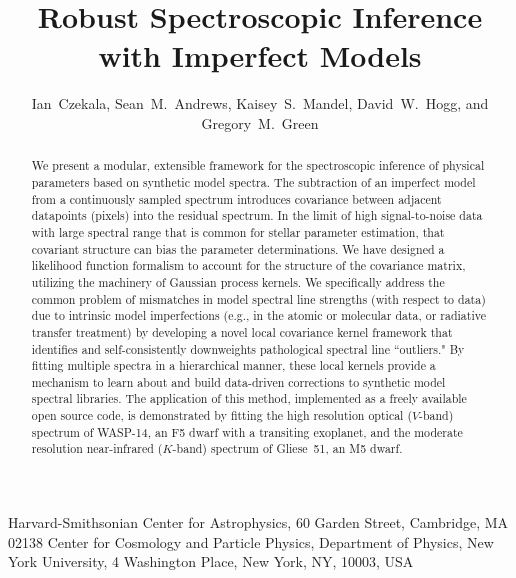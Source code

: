 \documentclass[iop,floatfix,numberedappendix,twocolappendix]{emulateapj}
\begin{document}

\title{Robust Spectroscopic Inference with Imperfect Models}

\newcommand{\harvard}{1}
\newcommand{\nyu}{2}
\newcommand{\mpia}{3}
\newcommand{\cds}{4}

\author{%
  Ian~Czekala\altaffilmark{\harvard }, 
  Sean~M.~Andrews\altaffilmark{\harvard },
  Kaisey~S.~Mandel\altaffilmark{\harvard },
  David~W.~Hogg\altaffilmark{\nyu },
  and Gregory~M.~Green\altaffilmark{\harvard}
}

\altaffiltext{\harvard}  {Harvard-Smithsonian Center for Astrophysics, 
			 60 Garden Street, Cambridge, MA 02138}
\altaffiltext{\nyu}      {Center for Cosmology and Particle Physics,
                          Department of Physics, New York University,
                          4 Washington Place, New York, NY, 10003, USA}


\begin{abstract}
We present a modular, extensible framework for the spectroscopic inference of 
physical parameters based on synthetic model spectra.  The subtraction of an 
imperfect model from a continuously sampled spectrum introduces covariance 
between adjacent datapoints (pixels) into the residual spectrum.  In the limit 
of high signal-to-noise data with large spectral range that is common for 
stellar parameter estimation, that covariant structure can bias the parameter 
determinations.  We have designed a likelihood function formalism to account 
for the structure of the covariance matrix, utilizing the machinery of Gaussian 
process kernels.  We specifically address the common problem of mismatches in 
model spectral line strengths (with respect to data) due to intrinsic model 
imperfections (e.g., in the atomic or molecular data, or radiative transfer 
treatment) by developing a novel local covariance kernel framework that 
identifies and self-consistently downweights pathological spectral line 
``outliers."  By fitting multiple spectra in a hierarchical manner, these local 
kernels provide a mechanism to learn about and build data-driven corrections to 
synthetic model spectral libraries.  The application of this method, 
implemented as a freely available open source code, is demonstrated by fitting 
the high resolution optical ($V$-band) spectrum of WASP-14, an F5 dwarf with a 
transiting exoplanet, and the moderate resolution near-infrared ($K$-band) 
spectrum of Gliese~51, an M5 dwarf. 
\end{abstract}
\end{document}
